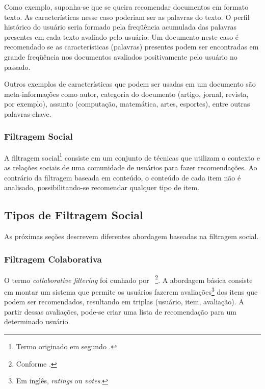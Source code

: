 Como exemplo, suponha-se que se queira recomendar documentos em formato texto. As características nesse caso poderiam ser as palavras do texto. O perfil histórico do usuário seria formado pela freqüência acumulada das palavras presentes em cada texto avaliado pelo usuário. Um documento neste caso é recomendado se as características (palavras) presentes podem ser encontradas em grande freqüência nos documentos avaliados positivamente pelo usuário no passado.

Outros exemplos de características que podem ser usadas em um documento são meta-informações como autor, categoria do documento (artigo, jornal, revista, por exemplo), assunto (computação, matemática, artes, esportes), entre outras palavras-chave.


\subsubsection{Filtragem Social} %


A filtragem social\footnote{Termo originado em \cite{Malone87} segundo \cite{Hill95}.} consiste em um conjunto de técnicas que utilizam o contexto e as relações sociais de uma comunidade de usuários para fazer recomendações. Ao contrário da filtragem baseada em conteúdo, o conteúdo de cada item não é analisado, possibilitando-se recomendar qualquer tipo de item.

\subsection{Tipos de Filtragem Social}

 As próximas seções descrevem diferentes abordagem baseadas na filtragem social.

\subsubsection{Filtragem Colaborativa}

O termo \textit{collaborative filtering} foi cunhado por \cite{Goldberg92}~\footnote{Conforme \cite{Resnick97}.}. A abordagem básica consiste em montar um sistema que permite os usuários fazerem avaliações\footnote{Em inglês, \textit{ratings} ou \textit{votes}.} dos itens que podem ser recomendados, resultando em triplas (usuário, item, avaliação). A partir dessas avaliações, pode-se criar uma lista de recomendação para um determinado usuário.

